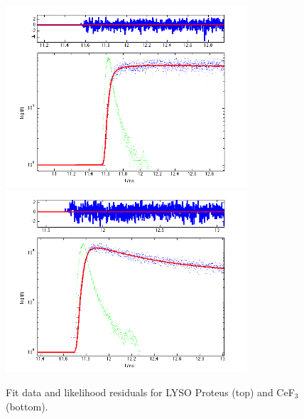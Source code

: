 \begin{figure}[htbp]
\begin{center}
\includegraphics[width=9cm]{../Pictures/Chapter_7/2737_proteus.png}
\includegraphics[width=9cm]{../Pictures/Chapter_7/cef3.png}
\end{center}
\caption[LYSO Sipat and Proteus profile]{Fit data and likelihood residuals for LYSO Proteus (top) and CeF$_{3}$ (bottom).}
\label{fig:sipat_proteus}
\end{figure}



